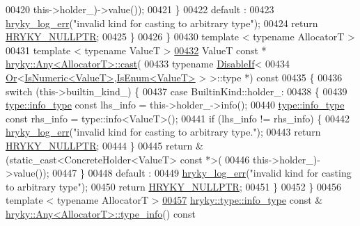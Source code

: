 \begin{DoxyCode}
00420                 this->holder\_)->value());
00421         \}
00422     \textcolor{keywordflow}{default} :
00423         \hyperlink{log__writer__common_8h_ae5ad3dabb33f594695ef40753cb78aad}{hryky_log_err}(\textcolor{stringliteral}{"invalid kind for casting to arbitrary type"});
00424         \textcolor{keywordflow}{return} \hyperlink{common_8h_a4cd4ac09cfcdbd6b30ee69afc156e210}{HRYKY_NULLPTR};
00425     \}
00426 \}
00430 \textcolor{keyword}{template} < \textcolor{keyword}{typename} AllocatorT >
00431 \textcolor{keyword}{template} < \textcolor{keyword}{typename} ValueT >
\hypertarget{any_8h_source_l00432}{}\hyperlink{classhryky_1_1_any_af8beccd8c9d59f2c45fc4c1037eb5d94}{00432} ValueT \textcolor{keyword}{const} * \hyperlink{classhryky_1_1_any}{hryky::Any<AllocatorT>::cast}(
00433     \textcolor{keyword}{typename} \hyperlink{classhryky_1_1_disable_if}{DisableIf}<
00434         \hyperlink{classhryky_1_1_or}{Or}<\hyperlink{classhryky_1_1_is_numeric}{IsNumeric<ValueT>},\hyperlink{classhryky_1_1_is_enum}{IsEnum<ValueT>} > >::type *)\textcolor{keyword}{ const}
00435 \textcolor{keyword}{}\{
00436     \textcolor{keywordflow}{switch} (this->builtin\_kind\_) \{
00437     \textcolor{keywordflow}{case} BuiltinKind::holder\_:
00438         \{
00439             \hyperlink{classhryky_1_1type_1_1_info}{type::info_type} \textcolor{keyword}{const} lhs\_info = this->holder\_->info();
00440             \hyperlink{classhryky_1_1type_1_1_info}{type::info_type} \textcolor{keyword}{const} rhs\_info = type::info<ValueT>();
00441             \textcolor{keywordflow}{if} (lhs\_info != rhs\_info) \{
00442                 \hyperlink{log__writer__common_8h_ae5ad3dabb33f594695ef40753cb78aad}{hryky_log_err}(\textcolor{stringliteral}{"invalid kind for casting to arbitrary type."});
00443                 \textcolor{keywordflow}{return} \hyperlink{common_8h_a4cd4ac09cfcdbd6b30ee69afc156e210}{HRYKY_NULLPTR};
00444             \}
00445             \textcolor{keywordflow}{return} &(\textcolor{keyword}{static\_cast<}ConcreteHolder<ValueT> \textcolor{keyword}{const }*\textcolor{keyword}{>}(
00446                 this->holder\_)->value());
00447         \}
00448     \textcolor{keywordflow}{default} :
00449         \hyperlink{log__writer__common_8h_ae5ad3dabb33f594695ef40753cb78aad}{hryky_log_err}(\textcolor{stringliteral}{"invalid kind for casting to arbitrary type"});
00450         \textcolor{keywordflow}{return} \hyperlink{common_8h_a4cd4ac09cfcdbd6b30ee69afc156e210}{HRYKY_NULLPTR};
00451     \}
00452 \}
00456 \textcolor{keyword}{template} < \textcolor{keyword}{typename} AllocatorT >
\hypertarget{any_8h_source_l00457}{}\hyperlink{classhryky_1_1_any_a17068d39ea56f8b086e4c97086082b30}{00457} \hyperlink{classhryky_1_1type_1_1_info}{hryky::type::info_type} \textcolor{keyword}{const} & \hyperlink{classhryky_1_1_any}{hryky::Any<AllocatorT>::type_info}()\textcolor{keyword}{ const}

\end{DoxyCode}
